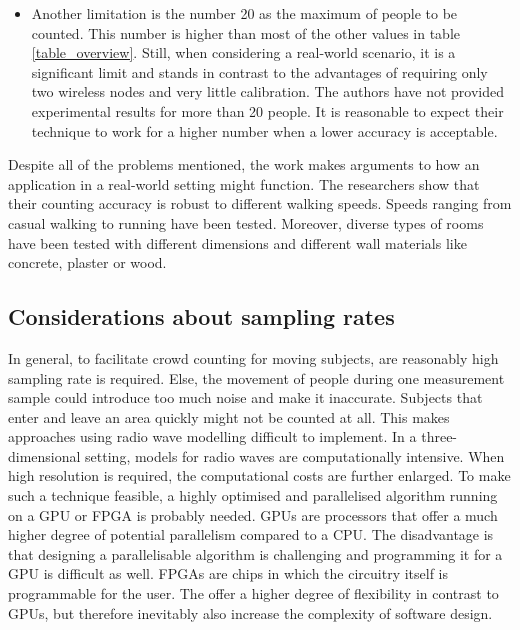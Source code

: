 \documentclass[conference]{IEEEtran}
\begin{document}
\begin{itemize}
\item Another limitation is the number 20 as the maximum of people to be counted. This number is higher than most of the other values in table \ref{table_overview}. Still, when considering a real-world scenario, it is a significant limit and stands in contrast to the advantages of requiring only two wireless nodes and very little calibration. The authors have not provided experimental results for more than 20 people. It is reasonable to expect their technique to work for a higher number when a lower accuracy is acceptable. 
\end{itemize}
Despite all of the problems mentioned, the work makes arguments to how an application in a real-world setting might function. The researchers show that their counting accuracy is robust to different walking speeds. Speeds ranging from casual walking to running have been tested. Moreover, diverse types of rooms have been tested with different dimensions and different wall materials like concrete, plaster or wood.

\subsection{Considerations about sampling rates}
In general, to facilitate crowd counting for moving subjects, are reasonably high sampling rate is required. Else, the movement of people during one measurement sample could introduce too much noise and make it inaccurate. Subjects that enter and leave an area quickly might not be counted at all. This makes approaches using radio wave modelling difficult to implement. In a three-dimensional setting, models for radio waves are computationally intensive. When high resolution is required, the computational costs are further enlarged. To make such a technique feasible, a highly optimised and parallelised algorithm running on a GPU or FPGA is probably needed. GPUs are processors that offer a much higher degree of potential parallelism compared to a CPU. The disadvantage is that designing a parallelisable algorithm is challenging and programming it for a GPU is difficult as well. FPGAs are chips in which the circuitry itself is programmable for the user. The offer a higher degree of flexibility in contrast to GPUs, but therefore inevitably also increase the complexity of software design.
\end{document}
